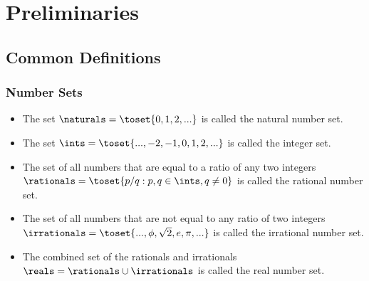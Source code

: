 \documentclass[../proofs.tex]{subfiles}
\begin{document}
\chapter{Preliminaries}
  
  
  
  
  
  

  \section{Common Definitions}
  \subsection{Number Sets}{\label{subsec: defnumbersets}}
  \begin{itemize}
    \item The set $\naturals = \toset{0, 1, 2, ...}$ is called the natural
    number set.
    \item The set $\ints = \toset{ ..., -2, -1, 0, 1, 2, ... }$ is called
    the integer set.
    \item The set of all numbers that are equal to a ratio of any two
    integers $\rationals = \toset{p/q : p, q \in \ints, q \neq 0}$ is called
    the rational number set.
    \item The set of all numbers that are not equal to any ratio of two
    integers $\irrationals = \toset{..., \phi, \sqrt{2}, e, \pi, ...}$ is
    called the irrational number set.
    \item The combined set of the rationals and irrationals
    $\reals = \rationals \cup \irrationals$ is called the real number set.
  \end{itemize}

  
\end{document}

